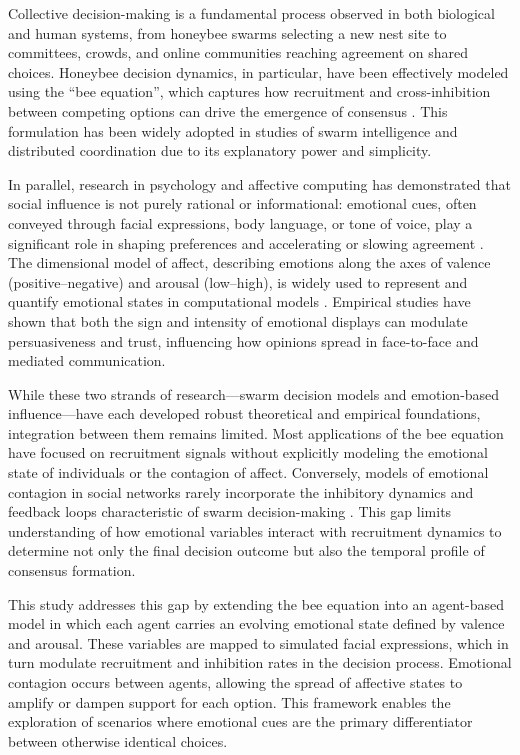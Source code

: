 \documentclass[a4paper,twoside]{article}
\begin{document}
Collective decision-making is a fundamental process observed in both biological and human systems, from honeybee swarms selecting a new nest site to committees, crowds, and online communities reaching agreement on shared choices. Honeybee decision dynamics, in particular, have been effectively modeled using the ``bee equation'', which captures how recruitment and cross-inhibition between competing options can drive the emergence of consensus \cite{Seeley2011,Chase25}. This formulation has been widely adopted in studies of swarm intelligence and distributed coordination due to its explanatory power and simplicity.

In parallel, research in psychology and affective computing has demonstrated that social influence is not purely rational or informational: emotional cues, often conveyed through facial expressions, body language, or tone of voice, play a significant role in shaping preferences and accelerating or slowing agreement \cite{Hatfield1994,Freire25abm}. The dimensional model of affect, describing emotions along the axes of valence (positive–negative) and arousal (low–high), is widely used to represent and quantify emotional states in computational models \cite{Russell1980}. Empirical studies have shown that both the sign and intensity of emotional displays can modulate persuasiveness and trust, influencing how opinions spread in face-to-face and mediated communication.

While these two strands of research—swarm decision models and emotion-based influence—have each developed robust theoretical and empirical foundations, integration between them remains limited. Most applications of the bee equation have focused on recruitment signals without explicitly modeling the emotional state of individuals or the contagion of affect. Conversely, models of emotional contagion in social networks rarely incorporate the inhibitory dynamics and feedback loops characteristic of swarm decision-making \cite{vanHaeringen2021}. This gap limits understanding of how emotional variables interact with recruitment dynamics to determine not only the final decision outcome but also the temporal profile of consensus formation.

This study addresses this gap by extending the bee equation into an agent-based model in which each agent carries an evolving emotional state defined by valence and arousal. These variables are mapped to simulated facial expressions, which in turn modulate recruitment and inhibition rates in the decision process. Emotional contagion occurs between agents, allowing the spread of affective states to amplify or dampen support for each option. This framework enables the exploration of scenarios where emotional cues are the primary differentiator between otherwise identical choices.
\end{document}
